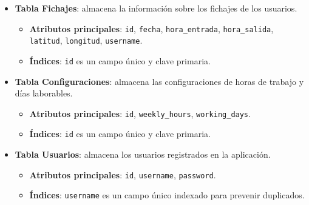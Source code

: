 \begin{itemize}
  \item \textbf{Tabla Fichajes}: almacena la información sobre los fichajes de los usuarios.
  \begin{itemize}
    \item \textbf{Atributos principales}: \texttt{id}, \texttt{fecha}, \texttt{hora\_entrada}, \texttt{hora\_salida}, \texttt{latitud}, \texttt{longitud}, \texttt{username}.
    \item \textbf{Índices}: \texttt{id} es un campo único y clave primaria.
  \end{itemize}
  \item \textbf{Tabla Configuraciones}: almacena las configuraciones de horas de trabajo y días laborables.
  \begin{itemize}
    \item \textbf{Atributos principales}: \texttt{id}, \texttt{weekly\_hours}, \texttt{working\_days}.
    \item \textbf{Índices}: \texttt{id} es un campo único y clave primaria.
  \end{itemize}
  \item \textbf{Tabla Usuarios}: almacena los usuarios registrados en la aplicación.
  \begin{itemize}
    \item \textbf{Atributos principales}: \texttt{id}, \texttt{username}, \texttt{password}.
    \item \textbf{Índices}: \texttt{username} es un campo único indexado para prevenir duplicados.
  \end{itemize}
\end{itemize}
